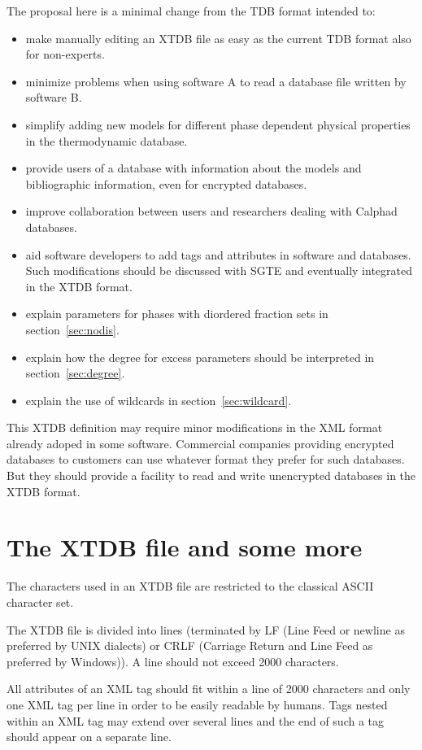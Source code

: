 \documentclass{article}
\begin{document}
The proposal here is a minimal change from the TDB format intended to:
\begin{itemize}
  \item make manually editing an XTDB file as easy as the current TDB
    format also for non-experts.
  \item minimize problems when using software A to read a database
    file written by software B.
  \item simplify adding new models for different phase dependent physical
    properties in the thermodynamic database.
  \item provide users of a database with information about the models
    and bibliographic information, even for encrypted databases.
  \item improve collaboration between users and researchers dealing
    with Calphad databases.
  \item aid software developers to add tags and attributes in software
    and databases.  Such modifications should be discussed with SGTE
    and eventually integrated in the XTDB format.
  \item explain parameters for phases with diordered fraction sets in
    section~\ref{sec:nodis}.
  \item explain how the degree for excess parameters should be
    interpreted in section~\ref{sec:degree}.
  \item explain the use of wildcards in section~\ref{sec:wildcard}.
\end{itemize}

This XTDB definition may require minor modifications in the XML format
already adoped in some software.  Commercial companies providing
encrypted databases to customers can use whatever format they prefer
for such databases.  But they should provide a facility to read and
write unencrypted databases in the XTDB format.

\section{The XTDB file and some more}

The characters used in an XTDB file are restricted to the classical
ASCII character set.

The XTDB file is divided into lines (terminated by LF (Line Feed or
newline as preferred by UNIX dialects) or CRLF (Carriage Return and
Line Feed as preferred by Windows)).  A line should not exceed 2000
characters.

All attributes of an XML tag should fit within a line of 2000
characters and only one XML tag per line in order to be easily
readable by humans.  Tags nested within an XML tag may extend over
several lines and the end of such a tag should appear on a separate line.
\end{document}
